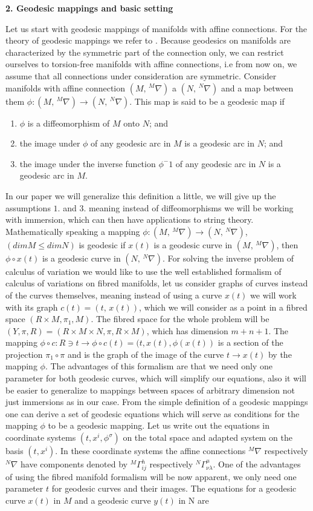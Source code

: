 \documentclass[english]{article}
\begin{document}
\begin{center}
{\bf 2. Geodesic mappings and basic setting}
\end{center}
Let us start with geodesic mappings of manifolds with affine connections. For the theory of geodesic mappings we refer to \cite{mik}. Because geodesics on manifolds are characterized by the symmetric part of the connection only, we can restrict ourselves to torsion-free manifolds with affine connections, i.e from now on, we assume that all connections under consideration are symmetric. Consider manifolds with affine connection  $(M,\,^M\nabla)$ a $(N,\,^N\nabla)$ and a map between them $\phi: (M,\,^M\nabla)\longrightarrow(N,\,^N\nabla)$. This map is said to be a geodesic map if
\begin{enumerate}
    \item  $\phi$ is a diffeomorphism of $M$ onto $N$; and
    \item the image under $\phi$ of any geodesic arc in $M$ is a geodesic arc in $N$; and
    \item the image under the inverse function $\phi ^−1$ of any geodesic arc in $N$ is a geodesic arc in $M$.
\end{enumerate}
In our paper we will generalize this definition a little, we will give up the assumptions $1.$ and $3.$ meaning instead of diffeomorphisms we will be working with immersion, which can then have applications to string theory. Mathematically speaking a mapping $\phi: (M,\,^M\nabla)\longrightarrow(N,\,^N\nabla)$, $(dim M\leq dim N)$ is geodesic if $x(t)$ is a geodesic curve in $(M,\,^M\nabla)$, then $\phi \circ x(t)$ is a geodesic curve in $(N,\,^N\nabla)$. For solving the inverse problem of calculus of variation we would like to use the well established formalism of calculus of variations on fibred manifolds, let us consider graphs of curves instead of the curves themselves, meaning instead of using a curve $x(t)$ we will work with its graph $c(t)=(t,\,x(t))$, which we will consider as a point in a fibred space  $(R\times M,\pi_1,M)$. The fibred space for the whole problem will be $(Y,\pi,R)=(R\times M\times N,\pi,R\times M)$, which has dimension $m+n+1$. The mapping $\phi\circ c: R\ni t \rightarrow \phi\circ c(t)=(t,x(t),\phi(x(t))$ is a section of the projection $\pi_1\circ\pi$ and is the graph of the image of the curve $t\rightarrow x(t)$ by the mapping $\phi$. The advantages of this formalism are that we need only one parameter for both geodesic curves, which will simplify our equations, also it will be easier to generalize to mappings between spaces of arbitrary dimension not just immersions as in our case. From the simple definition of a geodesic mappings one can derive a set of geodesic equations which will serve as conditions for the mapping $\phi$ to be a geodesic mapping. Let us write out the equations in coordinate systems $(t, x^i, \phi^\sigma)$ on the total space and adapted system on the basis $(t, x^i)$. In these coordinate systems the affine connections $^M\nabla$ respectively $^N\nabla$ have components denoted by $^M\Gamma^h_{ij}$ respectively $^N\Gamma^\mu_{\nu\lambda}$. One of the advantages of using the fibred manifold formalism will be now apparent, we only need one parameter $t$ for geodesic curves and their images. The equations for a geodesic curve $x(t)$ in $M$ and a geodesic curve $y(t)$ in N are
\end{document}
